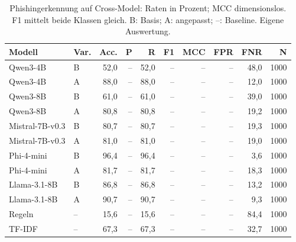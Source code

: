 \begin{table}[htbp]
\centering\scriptsize
\caption{Phishingerkennung auf Cross-Model: Raten in Prozent; MCC dimensionslos. F1 mittelt beide Klassen gleich. B: Basis; A: angepasst; –: Baseline. Eigene Auswertung.}
\label{tab:result-phishing-2}
\begin{tabular}{llrrrrrrrr}
\toprule
Modell & Var. & Acc. & P & R & F1 & MCC & FPR & FNR & N \\
\midrule
Qwen3-4B & B & 52{,}0 & – & 52{,}0 & – & -- & – & 48{,}0 & 1000 \\
Qwen3-4B & A & 88{,}0 & – & 88{,}0 & – & -- & – & 12{,}0 & 1000 \\
Qwen3-8B & B & 61{,}0 & – & 61{,}0 & – & -- & – & 39{,}0 & 1000 \\
Qwen3-8B & A & 80{,}8 & – & 80{,}8 & – & -- & – & 19{,}2 & 1000 \\
Mistral-7B-v0.3 & B & 80{,}7 & – & 80{,}7 & – & -- & – & 19{,}3 & 1000 \\
Mistral-7B-v0.3 & A & 81{,}0 & – & 81{,}0 & – & -- & – & 19{,}0 & 1000 \\
Phi-4-mini & B & 96{,}4 & – & 96{,}4 & – & -- & – & 3{,}6 & 1000 \\
Phi-4-mini & A & 81{,}7 & – & 81{,}7 & – & -- & – & 18{,}3 & 1000 \\
Llama-3.1-8B & B & 86{,}8 & – & 86{,}8 & – & -- & – & 13{,}2 & 1000 \\
Llama-3.1-8B & A & 90{,}7 & – & 90{,}7 & – & -- & – & 9{,}3 & 1000 \\
Regeln & – & 15{,}6 & – & 15{,}6 & – & -- & – & 84{,}4 & 1000 \\
TF-IDF & – & 67{,}3 & – & 67{,}3 & – & -- & – & 32{,}7 & 1000 \\
\bottomrule
\end{tabular}
\end{table}

